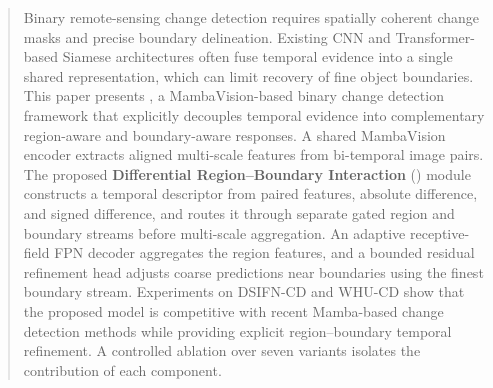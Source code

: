 \begin{abstract}
Binary remote-sensing change detection requires spatially coherent change masks and precise boundary delineation. Existing CNN and Transformer-based Siamese architectures often fuse temporal evidence into a single shared representation, which can limit recovery of fine object boundaries. This paper presents \textbf{\ours}, a MambaVision-based binary change detection framework that explicitly decouples temporal evidence into complementary region-aware and boundary-aware responses. A shared MambaVision encoder extracts aligned multi-scale features from bi-temporal image pairs. The proposed \textbf{Differential Region--Boundary Interaction} (\drbi) module constructs a temporal descriptor from paired features, absolute difference, and signed difference, and routes it through separate gated region and boundary streams before multi-scale aggregation. An adaptive receptive-field FPN decoder aggregates the region features, and a bounded residual refinement head adjusts coarse predictions near boundaries using the finest boundary stream. Experiments on DSIFN-CD and WHU-CD show that the proposed model is competitive with recent Mamba-based change detection methods while providing explicit region--boundary temporal refinement. A controlled ablation over seven variants isolates the contribution of each component.
\end{abstract}
